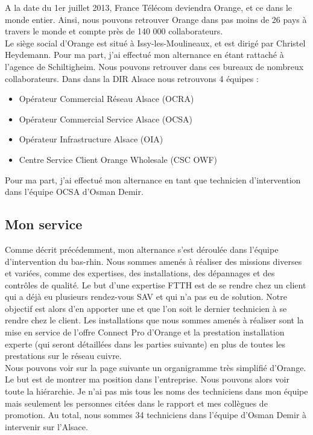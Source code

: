 \documentclass[12pt, a4paper]{article}
\begin{document}
A la date du 1er juillet 2013, France Télécom deviendra Orange, et ce dans le monde entier.
Ainsi, nous pouvons retrouver Orange dans pas moins de 26 pays à travers le monde et 
compte près de 140 000 collaborateurs.\\

Le siège social d'Orange est situé à Issy-les-Moulineaux,
et est dirigé par Christel Heydemann. Pour ma part, 
j'ai effectué mon alternance en étant rattaché 
à l'agence de Schiltigheim. Nous pouvons retrouver 
dans ces bureaux de nombreux collaborateurs. Dans 
dans la \gls{DIR} Alsace nous retrouvons 4 équipes :\\

\begin{itemize}
	\item Opérateur Commercial Réseau Alsace (OCRA)
	\item Opérateur Commercial Service Alsace (OCSA)
	\item Opérateur Infrastructure Alsace (OIA)
	\item Centre Service Client Orange Wholesale (CSC OWF)\\
\end{itemize}

Pour ma part, j'ai effectué mon alternance en tant que
technicien d'intervention dans l'équipe \gls{OCSA} d'Osman Demir.


\subsection{Mon service}
Comme décrit précédemment, mon alternance s'est déroulée
dans l'équipe d'intervention 
du bas-rhin. Nous sommes amenés à réaliser des missions diverses et 
variées, comme des 
expertises, des installations, des dépannages et 
des contrôles de qualité.
Le but d'une expertise \gls{FTTH} est de se rendre chez un client
qui a déjà eu plusieurs rendez-vous \gls{SAV} et qui n'a pas eu de solution. 
Notre objectif est alors d'en apporter une et que l'on 
soit le dernier technicien à se rendre chez le client.
Les installations que nous sommes amenés à réaliser sont
la mise en service de l'offre Connect Pro d'Orange et 
la prestation installation experte (qui seront détaillées dans les parties suivante)
en plus de toutes les prestations sur le réseau cuivre.\\

Nous pouvons voir sur la page suivante un organigramme 
très simplifié d'Orange. Le but est de montrer
ma position dans l'entreprise. Nous pouvons alors
voir toute la hiérarchie. Je n'ai pas mis tous les 
noms des techniciens dans mon équipe mais seulement 
les personnes citées dans le rapport et mes collègues 
de promotion. Au total, nous sommes 34 techniciens dans 
l'équipe d'Osman Demir à intervenir sur l'Alsace. 
\end{document}
